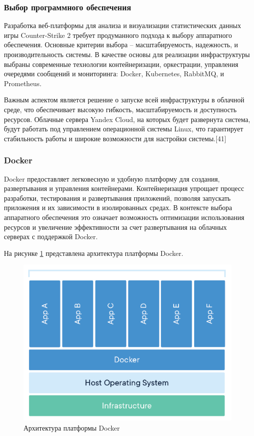 \subsubsection{Выбор программного обеспечения}

Разработка веб-платформы для анализа и визуализации статистических данных игры Counter-Strike 2 требует продуманного подхода к выбору аппаратного обеспечения. Основные критерии выбора – масштабируемость, надежность, и производительность системы. В качестве основы для реализации инфраструктуры выбраны современные технологии контейнеризации, оркестрации, управления очередями сообщений и мониторинга: Docker, Kubernetes, RabbitMQ, и Prometheus.

Важным аспектом является решение о запуске всей инфраструктуры в облачной среде, что обеспечивает высокую гибкость, масштабируемость и доступность ресурсов. Облачные сервера Yandex Cloud, на которых будет развернута система, будут работать под управлением операционной системы Linux, что гарантирует стабильность работы и широкие возможности для настройки системы.[41]

\subsubsection{Docker}

Docker предоставляет легковесную и удобную платформу для создания, развертывания и управления контейнерами. Контейнеризация упрощает процесс разработки, тестирования и развертывания приложений, позволяя запускать приложения и их зависимости в изолированных средах. В контексте выбора аппаратного обеспечения это означает возможность оптимизации использования ресурсов и увеличение эффективности за счет развертывания на облачных серверах с поддержкой Docker.

На рисунке \ref{fig:-Docker} представлена архитектура платформы Docker.
\begin{figure}
	\centering
	\includegraphics[width=0.9\linewidth]{"images/Docker"}
	\caption{Архитектура платформы Docker}
	\label{fig:-Docker}
\end{figure}

